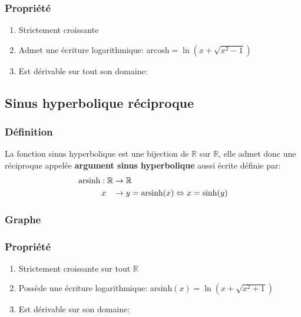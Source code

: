 \documentclass[12pt,a4paper]{report}
\begin{document}
	\subsubsection*{Propriété}
	\begin{enumerate}
		\item Strictement croissante
		\item Admet une écriture logarithmique: arcosh$= \ln(x+\sqrt{x^2-1})$
		\item Est dérivable sur tout son domaine: 
	\end{enumerate}
	\subsection*{Sinus hyperbolique réciproque}
	\subsubsection*{Définition}
	La fonction sinus hyperbolique est une bijection de $\mathbb{R}$ sur $\mathbb{R}$, elle admet donc une réciproque appelée \textbf{argument sinus hyperbolique} aussi écrite 
	 définie par:
	\begin{align*}
	\text{arsinh}: \mathbb{R} &\rightarrow \mathbb{R} \\
	x \hspace{0.3cm} &\rightarrow y =\text{arsinh}(x) \Leftrightarrow x=\sinh(y)
	\end{align*}
	\subsubsection*{Graphe}
	\subsubsection*{Propriété}
	\begin{enumerate}
		\item Strictement croissante sur tout $\mathbb{R}$
		\item Possède une écriture logarithmique: arsinh$(x)=\ln(x+\sqrt{x^2+1})$
		\item Est dérivable sur son domaine: 
	\end{enumerate}
\end{document}
